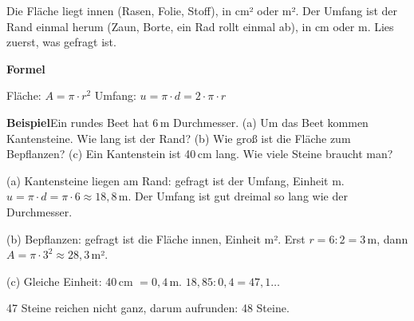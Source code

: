 \documentclass[11pt]{article}
\makeatletter
\newlength{\kr}
\newcommand{\karomerk}[2]{\protected@write\@auxout{}{\string\karoseite{#1}{#2}{\thepage}}}
\newcommand{\karoseite}[3]{\expandafter\xdef\csname karo@#1@#2\endcsname{#3}}
\makeatother
\begin{document}
\medskip
\par\vspace{3mm}\setlength{\kr}{\dimexpr\pagegoal-\pagetotal-10mm\relax}%
\ifdim\kr>12mm\karomerk{k}{C}\noindent{\scriptsize\color{mbgrau}Platz zum Rechnen}\par\nointerlineskip\vspace{1mm}\noindent
\begin{tikzpicture}\clip (0,0) rectangle ({\linewidth-0.5mm},\kr);\draw[black!16,line width=0.3pt,step=5mm] (0,0) grid (\linewidth,\kr);\end{tikzpicture}\fi\par
\clearpage\label{s:D}\noindent\colorbox{black!12}{}\hspace{3mm}{\Large\bfseries Fläche oder Umfang?}\par\smallskip
\noindent Die Fläche liegt innen (Rasen, Folie, Stoff), in cm² oder m². Der Umfang ist der Rand einmal herum (Zaun, Borte, ein Rad rollt einmal ab), in cm oder m. Lies zuerst, was gefragt ist.\par\medskip
\noindent\textbf{Formel}\par\nopagebreak\noindent\hspace*{4mm}\begin{minipage}{\dimexpr\linewidth-4mm\relax}Fläche: $A = \pi \cdot r^2$ \qquad Umfang: $u = \pi \cdot d = 2 \cdot \pi \cdot r$\end{minipage}\par\medskip
\noindent\textbf{Beispiel}\quad Ein rundes Beet hat 6\,m Durchmesser. (a) Um das Beet kommen Kantensteine. Wie lang ist der Rand? (b) Wie groß ist die Fläche zum Bepflanzen? (c) Ein Kantenstein ist 40\,cm lang. Wie viele Steine braucht man?\par\smallskip
\noindent\par\noindent{}(a) Kantensteine liegen am Rand: gefragt ist der Umfang, Einheit m. $u = \pi \cdot d = \pi \cdot 6 \approx 18{,}8$\,m. Der Umfang ist gut dreimal so lang wie der Durchmesser.\par\smallskip\par\noindent{}(b) Bepflanzen: gefragt ist die Fläche innen, Einheit m². Erst $r = 6 : 2 = 3$\,m, dann $A = \pi \cdot 3^2 \approx 28{,}3$\,m².\par\smallskip\par\noindent{}(c) Gleiche Einheit: 40\,cm $= 0{,}4$\,m. $18{,}85 : 0{,}4 = 47{,}1\ldots$\par\smallskip\par\noindent{}47 Steine reichen nicht ganz, darum aufrunden: 48 Steine.\par\smallskip\par\medskip
\end{document}
